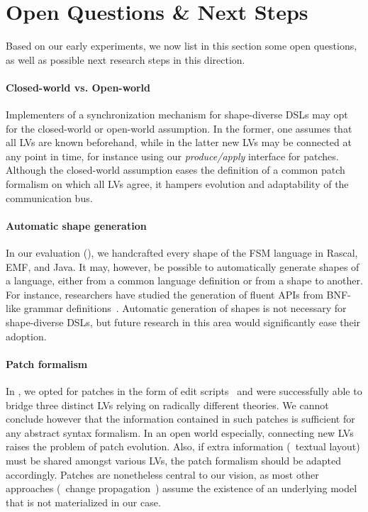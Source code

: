 \section{Open Questions \& Next Steps}
\label{sec:discussion}
Based on our early experiments, we now list in this section some open questions, as well as possible next research steps in this direction.

\paragraph{Closed-world vs. Open-world}
Implementers of a synchronization mechanism for shape-diverse DSLs may opt for the closed-world or open-world assumption.
In the former, one assumes that all LVs are known beforehand, while in the latter new LVs may be connected at any point in time, for instance using our \emph{produce/apply} interface for patches.
Although the closed-world assumption eases the definition of a common patch formalism on which all LVs agree, it hampers evolution and adaptability of the communication bus.

\paragraph{Automatic shape generation}
In our evaluation (), we handcrafted every shape of the FSM language in Rascal, EMF, and Java.
It may, however, be possible to automatically generate shapes of a language, either from a common language definition or from a shape to another.
For instance, researchers have studied the generation of fluent APIs from BNF-like grammar definitions~\cite{nakamaru2017silverchain}.
Automatic generation of shapes is not necessary for shape-diverse DSLs, but future research in this area would significantly ease their adoption.

\paragraph{Patch formalism}
In \prism, we opted for patches in the form of edit scripts~\cite{rozen2017towards} and were successfully able to bridge three distinct LVs relying on radically different theories.
We cannot conclude however that the information contained in such patches is sufficient for any abstract syntax formalism.
In an open world especially, connecting new LVs raises the problem of patch evolution.
Also, if extra information (\eg~textual layout) must be shared amongst various LVs, the patch formalism should be adapted accordingly. %
Patches are nonetheless central to our vision, as most other approaches (\eg~change propagation~\cite{DBLP:conf/etaps/SemerathDHV16}) assume the existence of an underlying model that is not materialized in our case.

